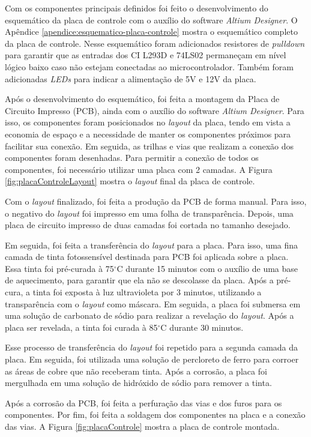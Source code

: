 Com os componentes principais definidos foi feito o desenvolvimento do esquemático da placa de controle com o auxílio do software \textit{Altium Designer}.
O Apêndice \ref{apendice:esquematico-placa-controle} mostra o esquemático completo da placa de controle.
Nesse esquemático foram adicionados resistores de \textit{pulldown} para garantir que as entradas dos CI L293D e 74LS02 permaneçam em nível lógico baixo caso não estejam conectadas ao microcontrolador.
Também foram adicionadas \textit{LEDs} para indicar a alimentação de 5V e 12V da placa.

Após o desenvolvimento do esquemático, foi feita a montagem da Placa de Circuito Impresso (PCB), ainda com o auxílio do software \textit{Altium Designer}.
Para isso, os componentes foram posicionados no \textit{layout} da placa, tendo em vista a economia de espaço e a necessidade de manter os componentes próximos para facilitar sua conexão.
Em seguida, as trilhas e vias que realizam a conexão dos componentes foram desenhadas. 
Para permitir a conexão de todos os componentes, foi necessário utilizar uma placa com 2 camadas.
A Figura \ref{fig:placaControleLayout} mostra o \textit{layout} final da placa de controle.

Com o \textit{layout} finalizado, foi feita a produção da PCB de forma manual.
Para isso, o negativo do \textit{layout} foi impresso em uma folha de transparência.
Depois, uma placa de circuito impresso de duas camadas foi cortada no tamanho desejado.

Em seguida, foi feita a transferência do \textit{layout} para a placa.
Para isso, uma fina camada de tinta fotossensível destinada para PCB foi aplicada sobre a placa.
Essa tinta foi pré-curada à 75$^{\circ}$C durante 15 minutos com o auxílio de uma base de aquecimento, para garantir que ela não se descolasse da placa.
Após a pré-cura, a tinta foi exposta à luz ultravioleta por 3 minutos, utilizando a transparência com o \textit{layout} como máscara.
Em seguida, a placa foi submersa em uma solução de carbonato de sódio para realizar a revelação do \textit{layout}.
Após a placa ser revelada, a tinta foi curada à 85$^{\circ}$C durante 30 minutos.

Esse processo de transferência do \textit{layout} foi repetido para a segunda camada da placa.
Em seguida, foi utilizada uma solução de percloreto de ferro para corroer as áreas de cobre que não receberam tinta.
Após a corrosão, a placa foi mergulhada em uma solução de hidróxido de sódio para remover a tinta.

Após a corrosão da PCB, foi feita a perfuração das vias e dos furos para os componentes.
Por fim, foi feita a soldagem dos componentes na placa e a conexão das vias.
A Figura \ref{fig:placaControle} mostra a placa de controle montada.

